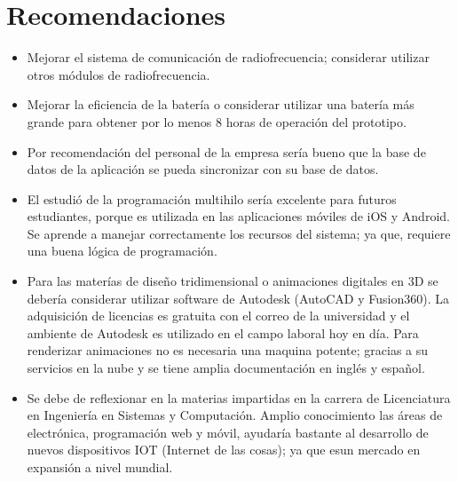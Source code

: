 \section{Recomendaciones}

\begin{itemize}
	
	\item Mejorar el sistema de comunicación de radiofrecuencia; considerar utilizar otros módulos de radiofrecuencia.
		
	\item Mejorar la eficiencia de la batería o considerar utilizar una batería más grande para obtener por lo menos 8 horas de operación del prototipo. 
	
	\item Por recomendación del personal de la empresa sería bueno que la base de datos de la aplicación se pueda sincronizar con su base de datos. 
	
	\item El estudió de la programación multihilo sería excelente para futuros estudiantes, porque es utilizada en las aplicaciones móviles de iOS y Android. Se aprende a manejar correctamente los recursos del sistema; ya que, requiere una buena lógica de programación.
	
	\item Para las materías de diseño tridimensional o animaciones digitales en 3D se debería considerar utilizar software de Autodesk (AutoCAD y Fusion360). La adquisición de licencias es gratuita con el correo de la universidad y el ambiente de Autodesk es utilizado en el campo laboral hoy en día. Para renderizar animaciones no es necesaria una maquina potente; gracias a su servicios en la nube y se tiene amplia documentación en inglés y español.
	
	\item Se debe de reflexionar en la materias impartidas en la carrera de Licenciatura en Ingeniería en Sistemas y Computación. Amplio conocimiento las áreas de electrónica, programación web y móvil, ayudaría bastante al desarrollo de nuevos dispositivos IOT (Internet de las cosas); ya que esun mercado en expansión a nivel mundial.
	
\end{itemize}
